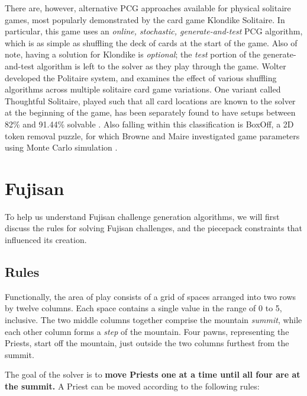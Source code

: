\documentclass[10pt,journal,compsoc]{IEEEtran}
\begin{document}
There are, however, alternative PCG approaches available for physical solitaire games, most popularly demonstrated by the card game Klondike Solitaire. In particular, this game uses an {\it online, stochastic, generate-and-test} PCG algorithm, which is as simple as shuffling the deck of cards at the start of the game. Also of note, having a solution for Klondike is {\it optional}; the {\it test} portion of the generate-and-test algorithm is left to the solver as they play through the game. Wolter \cite{SOLITAIREVARIANTS} developed the Politaire system, and examines the effect of various shuffling algorithms across multiple solitaire card game variations. One variant called Thoughtful Solitaire, played such that all card locations are known to the solver at the beginning of the game, has been separately found to have setups between 82\% and 91.44\% solvable \cite{THOUGHTFUL}. Also falling within this classification is BoxOff, a 2D token removal puzzle, for which Browne and Maire investigated game parameters using Monte Carlo simulation \cite{MCPUZZLE}.
\noindent

\section{Fujisan} \label{section:fujisan}


To help us understand Fujisan challenge generation algorithms, we will first discuss the rules for solving Fujisan challenges, and the piecepack constraints that influenced its creation.

\subsection{Rules}
 \noindent
Functionally, the area of play consists of a grid of spaces arranged into two rows by twelve columns. Each space contains a single value in the range of 0 to 5, inclusive. The two middle columns together comprise the mountain {\it summit}, while each other column forms a {\it step} of the mountain. Four pawns, representing the Priests, start off the mountain, just outside the two columns furthest from the summit.

The goal of the solver is to {\bf move Priests one at a time until all four are at the summit.} A Priest can be moved according to the following rules:  
\end{document}
